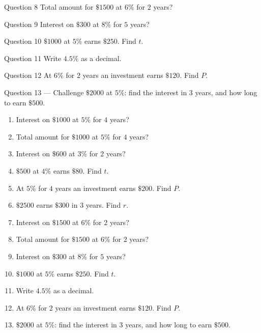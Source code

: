 \documentclass[11pt]{article}
\begin{document}
\begin{qbox}{Question 8}
Total amount for $\$1500$ at $6\%$ for $2$ years?\workspace{2.4cm}
\end{qbox}

\begin{qbox}{Question 9}
Interest on $\$300$ at $8\%$ for $5$ years?\workspace{2.4cm}
\end{qbox}

\begin{qbox}{Question 10}
$\$1000$ at $5\%$ earns $\$250$. Find $t$.\workspace{2.4cm}
\end{qbox}

\begin{qbox}{Question 11}
Write $4.5\%$ as a decimal.\workspace{2.4cm}
\end{qbox}

\begin{qbox}{Question 12}
At $6\%$ for $2$ years an investment earns $\$120$. Find $P$.\workspace{2.4cm}
\end{qbox}

\begin{qbox}{Question 13 --- Challenge}
$\$2000$ at $5\%$: find the interest in $3$ years, and how long to earn $\$500$.\workspace{3cm}
\end{qbox}

\clearpage
{}

\begin{recapbox}
\begin{multicols}{2}
\small
\begin{enumerate}[leftmargin=*,itemsep=3pt]
  \item Interest on $\$1000$ at $5\%$ for $4$ years?
  \item Total amount for $\$1000$ at $5\%$ for $4$ years?
  \item Interest on $\$600$ at $3\%$ for $2$ years?
  \item $\$500$ at $4\%$ earns $\$80$. Find $t$.
  \item At $5\%$ for $4$ years an investment earns $\$200$. Find $P$.
  \item $\$2500$ earns $\$300$ in $3$ years. Find $r$.
  \item Interest on $\$1500$ at $6\%$ for $2$ years?
  \item Total amount for $\$1500$ at $6\%$ for $2$ years?
  \item Interest on $\$300$ at $8\%$ for $5$ years?
  \item $\$1000$ at $5\%$ earns $\$250$. Find $t$.
  \item Write $4.5\%$ as a decimal.
  \item At $6\%$ for $2$ years an investment earns $\$120$. Find $P$.
  \item $\$2000$ at $5\%$: find the interest in $3$ years, and how long to earn $\$500$.
\end{enumerate}
\end{multicols}
\end{recapbox}
\end{document}
